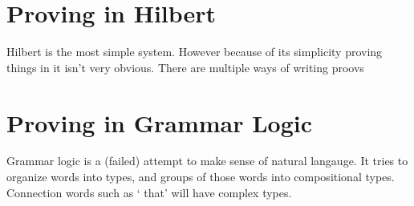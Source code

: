 \documentclass{article}
\begin{document}
\section{Proving in Hilbert}
Hilbert is the most simple system. However because of its simplicity proving
things in it isn't very obvious. There are multiple ways of writing proovs

\section{Proving in Grammar Logic}
Grammar logic is a (failed) attempt to make sense of natural langauge. It
tries to organize words into types, and groups of those words into compositional
types.
Connection words such as ` that' will have complex types.
\end{document}

